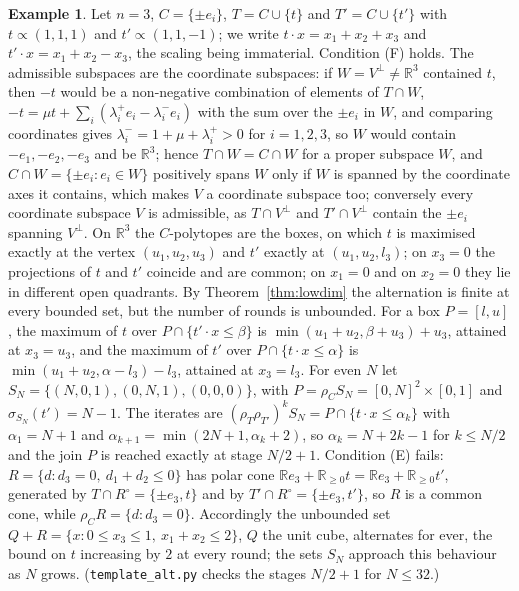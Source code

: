 \documentclass[11pt]{amsart}
\theoremstyle{definition}
\newtheorem{ex}[thm]{Example}
\begin{document}
\begin{ex}\label{ex:rounds}
Let $n=3$, $C=\{\pm e_i\}$, $T=C\cup\{t\}$ and $T'=C\cup\{t'\}$ with
$t\propto(1,1,1)$ and $t'\propto(1,1,-1)$; we write $t\cdot x=x_1+x_2+
x_3$ and $t'\cdot x=x_1+x_2-x_3$, the scaling being immaterial.
Condition (F) holds. The admissible subspaces are the coordinate
subspaces: if $W=V^\perp\ne\mathbb R^3$ contained $t$, then $-t$ would
be a non-negative combination of elements of $T\cap W$, $-t=\mu t+
\sum_i(\lambda_i^+e_i-\lambda_i^-e_i)$ with the sum over the $\pm e_i$
in $W$, and comparing coordinates gives $\lambda_i^-=1+\mu+\lambda_i^+
>0$ for $i=1,2,3$, so $W$ would contain $-e_1,-e_2,-e_3$ and be
$\mathbb R^3$; hence $T\cap W=C\cap W$ for a proper subspace $W$, and
$C\cap W=\{\pm e_i:e_i\in W\}$ positively spans $W$ only if $W$ is
spanned by the coordinate axes it contains, which makes $V$ a
coordinate subspace too; conversely every coordinate subspace $V$ is
admissible, as $T\cap V^\perp$ and $T'\cap V^\perp$ contain the $\pm
e_i$ spanning $V^\perp$. On $\mathbb R^3$ the
$C$-polytopes are the boxes, on which $t$ is maximised exactly at the
vertex $(u_1,u_2,u_3)$ and $t'$ exactly at $(u_1,u_2,l_3)$; on $x_3=0$
the projections of $t$ and $t'$ coincide and are common; on $x_1=0$ and
on $x_2=0$ they lie in different open quadrants. By
Theorem~\ref{thm:lowdim} the alternation is finite at every bounded
set, but the number of rounds is unbounded. For a box $P=[l,u]$, the
maximum of $t$ over $P\cap\{t'\cdot x\le\beta\}$ is $\min(u_1+u_2,
\beta+u_3)+u_3$, attained at $x_3=u_3$, and the maximum of $t'$ over
$P\cap\{t\cdot x\le\alpha\}$ is $\min(u_1+u_2,\alpha-l_3)-l_3$,
attained at $x_3=l_3$. For even $N$ let $S_N=\{(N,0,1),(0,N,1),
(0,0,0)\}$, with $P=\rho_CS_N=[0,N]^2\times[0,1]$ and $\sigma_{S_N}(t')
=N-1$. The iterates are $(\rho_T\rho_{T'})^kS_N=P\cap\{t\cdot x\le
\alpha_k\}$ with $\alpha_1=N+1$ and $\alpha_{k+1}=\min(2N+1,\alpha_k+
2)$, so $\alpha_k=N+2k-1$ for $k\le N/2$ and the join $P$ is reached
exactly at stage $N/2+1$. Condition (E) fails: $R=\{d:d_3=0,\ d_1+d_2
\le0\}$ has polar cone $\mathbb Re_3+\mathbb R_{\ge0}t=\mathbb Re_3+
\mathbb R_{\ge0}t'$, generated by $T\cap R^\circ=\{\pm e_3,t\}$ and by
$T'\cap R^\circ=\{\pm e_3,t'\}$, so $R$ is a common cone, while $\rho_C
R=\{d:d_3=0\}$. Accordingly the unbounded set $Q+R=\{x:0\le x_3\le1,\
x_1+x_2\le2\}$, $Q$ the unit cube, alternates for ever, the bound on
$t$ increasing by $2$ at every round; the sets $S_N$ approach this
behaviour as $N$ grows. (\texttt{template\_alt.py} checks the stages
$N/2+1$ for $N\le32$.)
\end{ex}
\end{document}
